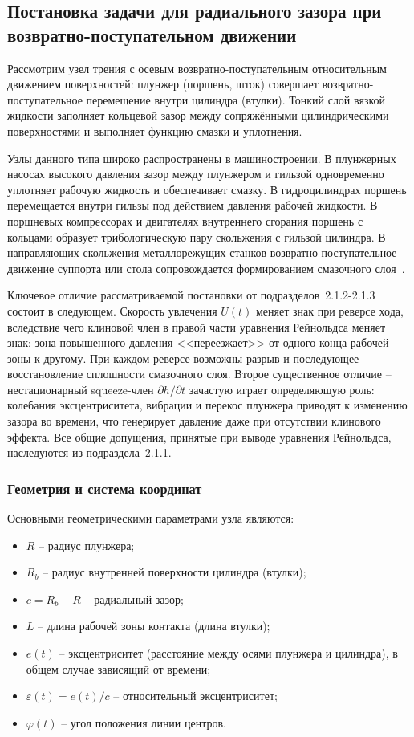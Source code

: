\subsection{Постановка задачи для радиального зазора при возвратно-поступательном движении}

Рассмотрим узел трения с осевым возвратно-поступательным относительным движением поверхностей: плунжер (поршень, шток) совершает возвратно-поступательное перемещение внутри цилиндра (втулки). Тонкий слой вязкой жидкости заполняет кольцевой зазор между сопряжёнными цилиндрическими поверхностями и выполняет функцию смазки и уплотнения.

Узлы данного типа широко распространены в машиностроении. В плунжерных насосах высокого давления зазор между плунжером и гильзой одновременно уплотняет рабочую жидкость и обеспечивает смазку. В гидроцилиндрах поршень перемещается внутри гильзы под действием давления рабочей жидкости. В поршневых компрессорах и двигателях внутреннего сгорания поршень с кольцами образует трибологическую пару скольжения с гильзой цилиндра. В направляющих скольжения металлорежущих станков возвратно-поступательное движение суппорта или стола сопровождается формированием смазочного слоя~\cite{hori2002,szeri1998}.

Ключевое отличие рассматриваемой постановки от подразделов~2.1.2-2.1.3 состоит в следующем. Скорость увлечения $U(t)$ меняет знак при реверсе хода, вследствие чего клиновой член в правой части уравнения Рейнольдса меняет знак: зона повышенного давления <<переезжает>> от одного конца рабочей зоны к другому. При каждом реверсе возможны разрыв и последующее восстановление сплошности смазочного слоя. Второе существенное отличие -- нестационарный squeeze-член $\partial h/\partial t$ зачастую играет определяющую роль: колебания эксцентриситета, вибрации и перекос плунжера приводят к изменению зазора во времени, что генерирует давление даже при отсутствии клинового эффекта. Все общие допущения, принятые при выводе уравнения Рейнольдса, наследуются из подраздела~2.1.1.


\subsubsection*{Геометрия и система координат}

Основными геометрическими параметрами узла являются:
\begin{itemize}
\item $R$ -- радиус плунжера;
\item $R_b$ -- радиус внутренней поверхности цилиндра (втулки);
\item $c = R_b - R$ -- радиальный зазор;
\item $L$ -- длина рабочей зоны контакта (длина втулки);
\item $e(t)$ -- эксцентриситет (расстояние между осями плунжера и цилиндра), в общем случае зависящий от времени;
\item $\varepsilon(t) = e(t)/c$ -- относительный эксцентриситет;
\item $\varphi(t)$ -- угол положения линии центров.
\end{itemize}

